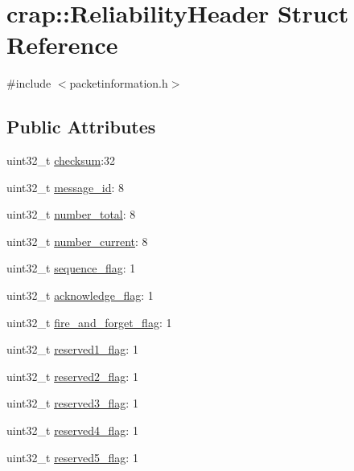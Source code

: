 \hypertarget{structcrap_1_1_reliability_header}{}\section{crap\+:\+:Reliability\+Header Struct Reference}
\label{structcrap_1_1_reliability_header}


{\ttfamily \#include $<$packetinformation.\+h$>$}

\subsection*{Public Attributes}
\begin{DoxyCompactItemize}
\item 
uint32\+\_\+t \hyperlink{structcrap_1_1_reliability_header_ad29af3f17ea49d36bcc2c49fdefd4007}{checksum}\+:32
\item 
uint32\+\_\+t \hyperlink{structcrap_1_1_reliability_header_ae57dee1a462c80b641089b15f26fa8f6}{message\+\_\+id}\+: 8
\item 
uint32\+\_\+t \hyperlink{structcrap_1_1_reliability_header_a75c2c46f6518e8594841091ad2d0e574}{number\+\_\+total}\+: 8
\item 
uint32\+\_\+t \hyperlink{structcrap_1_1_reliability_header_acef2cb3ff99e0229f478a1cfe800e3c2}{number\+\_\+current}\+: 8
\item 
uint32\+\_\+t \hyperlink{structcrap_1_1_reliability_header_a5067aa35f5c5e20f76488f3ffda9fb37}{sequence\+\_\+flag}\+: 1
\item 
uint32\+\_\+t \hyperlink{structcrap_1_1_reliability_header_a89ee7e532195d21fa94b9320ffc12578}{acknowledge\+\_\+flag}\+: 1
\item 
uint32\+\_\+t \hyperlink{structcrap_1_1_reliability_header_aae57f5428ae59944ed200dc46795bc27}{fire\+\_\+and\+\_\+forget\+\_\+flag}\+: 1
\item 
uint32\+\_\+t \hyperlink{structcrap_1_1_reliability_header_affcfb76dc5c78fb16f7c6ebf79477ea5}{reserved1\+\_\+flag}\+: 1
\item 
uint32\+\_\+t \hyperlink{structcrap_1_1_reliability_header_a880d879095e1f27c1cc099784c9e5e63}{reserved2\+\_\+flag}\+: 1
\item 
uint32\+\_\+t \hyperlink{structcrap_1_1_reliability_header_a4f164e09f43d1cc64f855a364bbf2c04}{reserved3\+\_\+flag}\+: 1
\item 
uint32\+\_\+t \hyperlink{structcrap_1_1_reliability_header_af2745b28df7c0fc38e84a01e244c9447}{reserved4\+\_\+flag}\+: 1
\item 
uint32\+\_\+t \hyperlink{structcrap_1_1_reliability_header_aae860a6d234b2ef170e7d4b09484479f}{reserved5\+\_\+flag}\+: 1
\end{DoxyCompactItemize}


